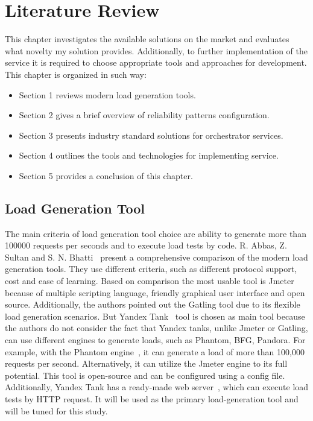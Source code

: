 \chapter{Literature Review}
\label{ch:lr}

This chapter investigates the available solutions on the market and evaluates what novelty my solution provides.
Additionally, to further implementation of the service it is required to choose appropriate tools and approaches for development.
This chapter is organized in such way:

\begin{itemize}
    \item Section 1 reviews modern load generation tools.
    \item Section 2 gives a brief overview of reliability patterns configuration.
    \item Section 3 presents industry standard solutions for orchestrator services.
    \item Section 4 outlines the tools and technologies for implementing service.
    \item Section 5 provides a conclusion of this chapter.
\end{itemize}

\section{Load Generation Tool}\label{sec:load_generation}
The main criteria of load generation tool choice are ability to generate more than 100000 requests per seconds and to execute load tests by code.
R. Abbas, Z. Sultan and S. N. Bhatti~\cite{load_testing_tools} present a comprehensive comparison of the modern load generation tools.
They use different criteria, such as different protocol support, cost and ease of learning.
Based on comparison the most usable tool is Jmeter because of multiple scripting language, friendly graphical user interface and open source.
Additionally, the authors pointed out the Gatling tool due to its flexible load generation scenarios.
But Yandex Tank~\cite{yandex_tank} tool is chosen as main tool because the authors do not consider the fact that Yandex tanks, unlike Jmeter or Gatling, can use different engines to generate loads, such as Phantom, BFG, Pandora.
For example, with the Phantom engine~\cite{phantom}, it can generate a load of more than 100,000 requests per second. Alternatively, it can utilize the Jmeter engine to its full potential. This tool is open-source and can be configured using a config file.
Additionally, Yandex Tank has a ready-made web server~\cite{yandex_tank_api}, which can execute load tests by HTTP request.
It will be used as the primary load-generation tool and will be tuned for this study.

